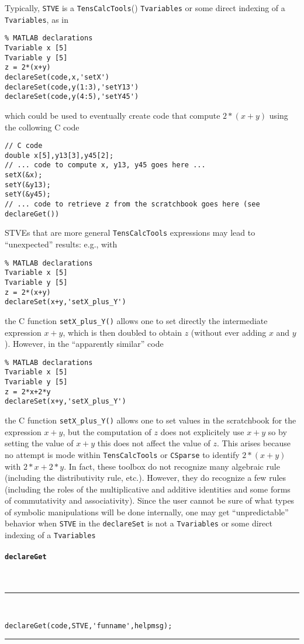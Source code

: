 \documentclass[11pt]{article}
\newcommand{\TC}{\texttt{TensCalcTools}}
\newcommand{\CS}{\texttt{CSparse}}
\newcommand{\codesize}{\footnotesize}
\newcommand{\toidx}[1]{\index{\lstinline{#1}}}%
\newenvironment{command}[1]{\toidx{#1}\addcontentsline{toc}{subsection}{\lstinline{#1}}\paragraph*{\lstinline[basicstyle=\large,columns={[l]flexible}]{#1}}~\\\noindent\rule{\textwidth}{2pt}\\\vspace{-3ex}\codesize}{\vspace{-3ex}\rule{\textwidth}{1pt}\medskip\noindent}
\begin{document}
Typically, \lstinline{STVE} is a \TC() \lstinline{Tvariables} or some
direct indexing of a \lstinline{Tvariables}, as in
\begin{lstlisting}
% MATLAB declarations 
Tvariable x [5]
Tvariable y [5]
z = 2*(x+y)
declareSet(code,x,'setX') 
declareSet(code,y(1:3),'setY13') 
declareSet(code,y(4:5),'setY45') 
\end{lstlisting}
  which could be used to eventually create code that compute
  $2*(x+y)$ using the collowing C code
\begin{lstlisting}
// C code
double x[5],y13[3],y45[2];
// ... code to compute x, y13, y45 goes here ...
setX(&x);
setY(&y13);
setY(&y45);
// ... code to retrieve z from the scratchbook goes here (see declareGet())
\end{lstlisting}
  STVEs that are more general \TC{} expressions may lead to
  ``unexpected'' results: e.g., with
\begin{lstlisting}
% MATLAB declarations 
Tvariable x [5]
Tvariable y [5]
z = 2*(x+y)
declareSet(x+y,'setX_plus_Y') 
\end{lstlisting}
  the C function \lstinline{setX_plus_Y()} allows one to set directly
  the intermediate expression $x+y$, which is then doubled to obtain
  $z$ (without ever adding $x$ and $y$). However, in the
  ``apparently similar'' code
\begin{lstlisting}
% MATLAB declarations 
Tvariable x [5]
Tvariable y [5]
z = 2*x+2*y
declareSet(x+y,'setX_plus_Y') 
\end{lstlisting}
  the C function \lstinline{setX_plus_Y()} allows one to set values in
  the scratchbook for the expression $x+y$, but the computation of $z$
  does not explicitely use $x+y$ so by setting the value of $x+y$ this
  does not affect the value of $z$. This arises because no attempt is
  mode within \TC{} or \CS{} to identify $2*(x+y)$ with $2*x+2*y$. In
  fact, these toolbox do not recognize many algebraic rule (including
  the distributivity rule, etc.). However, they do recognize a few
  rules (including the roles of the multiplicative and additive
  identities and some forms of commutativity and associativity). Since
  the user cannot be sure of what types of symbolic manipulations will
  be done internally, one may get ``unpredictable'' behavior when
  \lstinline{STVE} in the \lstinline{declareSet} is not a
  \lstinline{Tvariables} or some direct indexing of a
  \lstinline{Tvariables}

\begin{command}{declareGet}
\begin{lstlisting}
declareGet(code,STVE,'funname',helpmsg);
\end{lstlisting}
\end{command}
\end{document}
